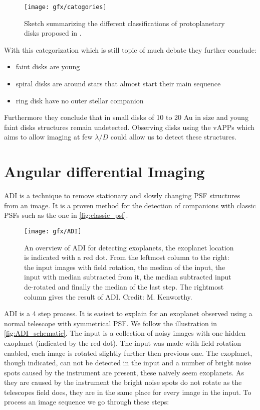 \begin{figure}[H]
    \caption{Sketch summarizing the different classifications of protoplanetary disks proposed in \cite{garufi}.}
    \centering
    \texttt{[image: gfx/catogories]}
    \label{fig:sketch_garufi}
\end{figure}

With this categorization which is still topic of much debate they \cite{garufi} further conclude:
\begin{itemize}
    \item faint disks are young
    \item spiral disks are around stars that almost start their main sequence
    \item ring disk have no outer stellar companion %
\end{itemize}

Furthermore they \cite{garufi} conclude that in small disks of 10 to 20 Au in size and young faint disks structures remain undetected. Observing disks using the \acp{vAPP} which aims to allow imaging at few $\lambda/D$ could allow us to detect these structures.

\section{Angular differential Imaging}
\label{sec:adi}
\ac{ADI} \cite{marois_2005} is a technique to remove stationary and slowly changing PSF structures from an image. It is a proven method for the detection of companions with classic \acp{PSF} such as the one in \autoref{fig:classic_psf}. %

\begin{figure}[H]
    \texttt{[image: gfx/ADI]}
    \caption{An overview of \ac{ADI} for detecting exoplanets, the exoplanet location is indicated with a red dot. From the leftmost column to the right: the input images with field rotation, the median of the input, the input with median subtracted from it, the median subtracted input de-rotated and finally the median of the last step. The rightmost column gives the result of ADI. Credit: M. Kenworthy.}
    \label{fig:ADI_schematic}
\end{figure}

\ac{ADI} is a 4 step process. It is easiest to explain for an exoplanet observed using a normal telescope with symmetrical \ac{PSF}. We follow the illustration in \autoref{fig:ADI_schematic}. The input is a collection of noisy images with one hidden exoplanet (indicated by the red dot). The input was made with field rotation enabled, each image is rotated slightly further then previous one. The exoplanet, though indicated, can not be detected in the input and a number of bright noise spots caused by the instrument are present, these naively seem exoplanets. As they are caused by the instrument the bright noise spots do not rotate as the telescopes field does, they are in the same place for every image in the input. To process an image sequence we go through these steps:

